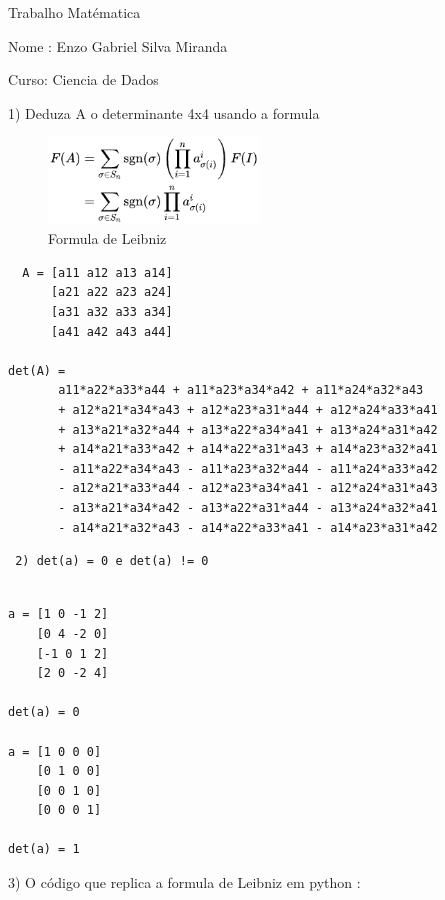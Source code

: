 \documentclass{article}
\begin{document}
Trabalho Matématica 

Nome : Enzo Gabriel Silva Miranda

Curso: Ciencia de Dados


1) Deduza A o determinante 4x4 usando a formula 
\begin{figure}[h]
  \centering
  \includegraphics[width=0.5\textwidth]{Imagem1.png}
  \caption{Formula de Leibniz}
  \label{fig:exemplo}
\end{figure}

 \begin{lstlisting}
  A = [a11 a12 a13 a14]
      [a21 a22 a23 a24]
      [a31 a32 a33 a34]
      [a41 a42 a43 a44]

det(A) = 
       a11*a22*a33*a44 + a11*a23*a34*a42 + a11*a24*a32*a43
       + a12*a21*a34*a43 + a12*a23*a31*a44 + a12*a24*a33*a41
       + a13*a21*a32*a44 + a13*a22*a34*a41 + a13*a24*a31*a42
       + a14*a21*a33*a42 + a14*a22*a31*a43 + a14*a23*a32*a41
       - a11*a22*a34*a43 - a11*a23*a32*a44 - a11*a24*a33*a42
       - a12*a21*a33*a44 - a12*a23*a34*a41 - a12*a24*a31*a43
       - a13*a21*a34*a42 - a13*a22*a31*a44 - a13*a24*a32*a41
       - a14*a21*a32*a43 - a14*a22*a33*a41 - a14*a23*a31*a42

\end{lstlisting}
\begin{lstlisting}
 2) det(a) = 0 e det(a) != 0   
\end{lstlisting}

\begin{lstlisting}

a = [1 0 -1 2]
    [0 4 -2 0]
    [-1 0 1 2]
    [2 0 -2 4]
    
det(a) = 0

a = [1 0 0 0]
    [0 1 0 0]
    [0 0 1 0]
    [0 0 0 1]
    
det(a) = 1

\end{lstlisting}


3) O código que replica a formula de Leibniz em python : 
\end{document}
